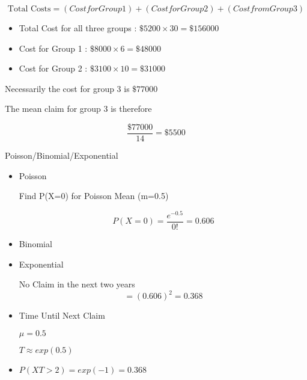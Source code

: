 \documentclass[]{report}
\begin{document}
\[\mbox{Total Costs} = (Cost for Group 1) + (Cost for Group 2) + (Cost from Group 3)\]

\begin{itemize}
	\item Total Cost for all three groups : $\$5200 \times 30 = \$156000$
	\item Cost for Group 1 : $\$8000 \times 6 = \$48000$
	\item Cost for Group 2 : $\$3100 \times 10 = \$31000$
\end{itemize}

Necessarily the cost for group 3 is $\$77000$

The mean claim for group 3 is therefore

\[ \frac{\$77000}{14} = \$5500 \]


Poisson/Binomial/Exponential

\begin{itemize}
	\item  Poisson
	
	Find P(X=0) for Poisson Mean (m=0.5)
	
	
	\[ P(X=0) = \frac{e^{-0.5}}{0!}  = 0.606 \]
	
	
	\item Binomial
	
	
	
	
	\item Exponential
	
	No Claim in the next two years
	\[	= (0.606)^2 = 0.368\]
	
	
	\item 	Time Until Next Claim
	
	$\mu= 0.5$
	
	$T \approx exp(0.5)$
	
	\item	$P(XT >2) = exp(-1) = 0.368$
	
\end{itemize}







\end{document}
